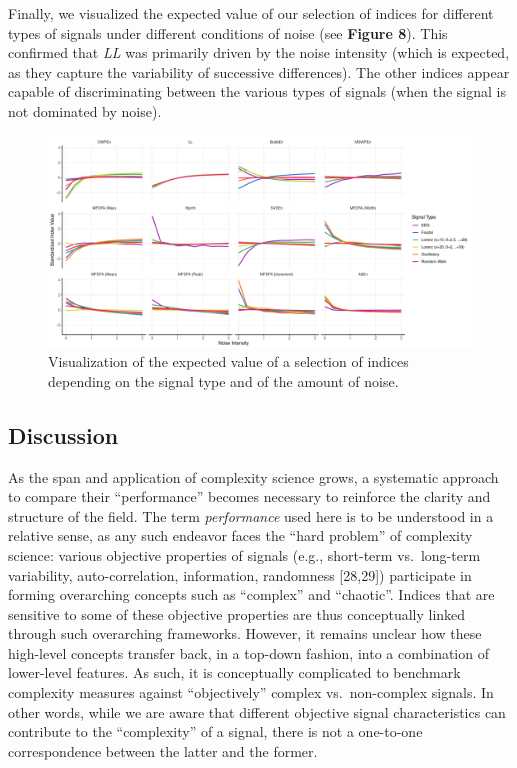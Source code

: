 \documentclass[
  man]{apa6}
\begin{document}
Finally, we visualized the expected value of our selection of indices for different types of signals under different conditions of noise (see \textbf{Figure 8}). This confirmed that \emph{LL} was primarily driven by the noise intensity (which is expected, as they capture the variability of successive differences). The other indices appear capable of discriminating between the various types of signals (when the signal is not dominated by noise).

\begin{figure}
\centering
\includegraphics{./figures/models-1.pdf}
\caption{\label{fig:models}Visualization of the expected value of a selection of indices depending on the signal type and of the amount of noise.}
\end{figure}

\hypertarget{discussion}{%
\subsection{Discussion}\label{discussion}}

As the span and application of complexity science grows, a systematic approach to compare their ``performance'' becomes necessary to reinforce the clarity and structure of the field. The term \emph{performance} used here is to be understood in a relative sense, as any such endeavor faces the ``hard problem'' of complexity science: various objective properties of signals (e.g., short-term vs.~long-term variability, auto-correlation, information, randomness {[}28,29{]}) participate in forming overarching concepts such as ``complex'' and ``chaotic''. Indices that are sensitive to some of these objective properties are thus conceptually linked through such overarching frameworks. However, it remains unclear how these high-level concepts transfer back, in a top-down fashion, into a combination of lower-level features. As such, it is conceptually complicated to benchmark complexity measures against ``objectively'' complex vs.~non-complex signals. In other words, while we are aware that different objective signal characteristics can contribute to the ``complexity'' of a signal, there is not a one-to-one correspondence between the latter and the former.
\end{document}
